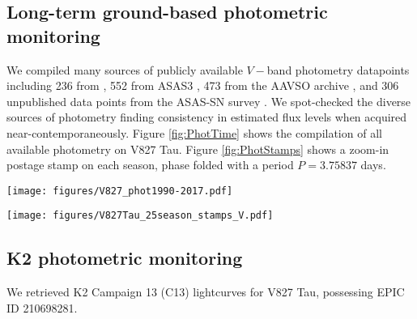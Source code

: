 \documentclass[twocolumn]{emulateapj}%
\begin{document}
\subsection{Long-term ground-based photometric monitoring} \label{sec:archival_phot}

We compiled many sources of publicly available $V-$band photometry datapoints including 236 from \citep{grankin08}, 552 from ASAS3 \citep{pojmanski04}, 473 from the AAVSO archive \citep{kafka16}, and 306 unpublished data points from the ASAS-SN survey \citep{shappee14}.  We spot-checked the diverse sources of photometry finding consistency in estimated flux levels when acquired near-contemporaneously. Figure \ref{fig:PhotTime} shows the compilation of all available photometry on V827 Tau.  Figure \ref{fig:PhotStamps} shows a zoom-in postage stamp on each season, phase folded with a period $P=3.75837$ days.

\begin{figure*}
 \centering
 \texttt{[image: figures/V827\_phot1990-2017.pdf]}
 \caption{Compilation of archival and new flux measurements in $V-$band for V827 Tau, normalized to the global maximum flux value, which occurred in 1990.  The y-axis equals the minimum starspot area, when flux deficits are interpreted with the simplest possible analytic starspot model.}
 \label{fig:PhotTime}
\end{figure*}

\begin{figure*}
 \centering
 \texttt{[image: figures/V827Tau\_25season\_stamps\_V.pdf]}
 \caption{Phase-folded $V-$band flux measurements of V827 Tau grouped into 25 observing seasons, and normalized to the global maximum in 1990.  The y-axis equals the minimum starspot area, when flux deficits are interpreted with the simplest possible analytic starspot model.}
 \label{fig:PhotStamps}
\end{figure*}

\subsection{K2 photometric monitoring} \label{sec:K2_obs}

We retrieved K2 Campaign 13 (C13) \cite{2014PASP..126..398H} lightcurves for V827 Tau, possessing EPIC ID 210698281.

\end{document}
